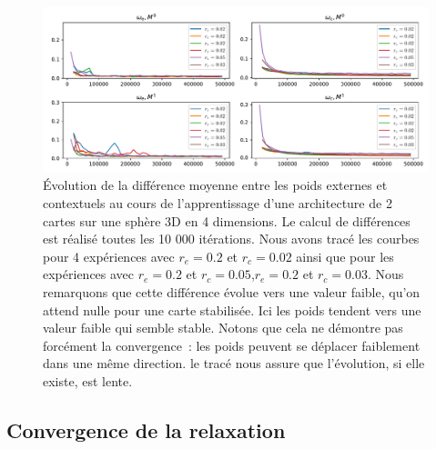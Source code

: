 \documentclass[../main]{subfiles}
\begin{document}
\begin{figure}
	\includegraphics[width=\textwidth]{evol_convergence_poids.pdf}
	\caption{\'Evolution de la différence moyenne entre les poids externes et contextuels au cours de l'apprentissage d'une architecture de 2 cartes sur une sphère 3D en 4 dimensions. Le calcul de différences est réalisé toutes les 10 000 itérations. Nous avons tracé les courbes pour 4 expériences avec $r_e = 0.2$ et $r_c = 0.02$ ainsi que pour les expériences avec $r_e = 0.2$ et $r_c = 0.05$,$r_e = 0.2$ et $r_c = 0.03$. Nous remarquons que cette différence évolue vers une valeur faible, qu'on attend nulle pour une carte stabilisée. Ici les poids tendent vers une valeur faible qui semble stable. Notons que cela ne démontre pas forcément la convergence~: les poids peuvent se déplacer faiblement dans une même direction. le tracé nous assure que l'évolution, si elle existe, est lente.}
\end{figure}



\subsection{Convergence de la relaxation}
\end{document}
